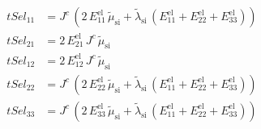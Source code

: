\begin{align}
tSel_{11} &= J^{c}\,\left(2\,E_{11}^{\mathrm{el}}\,\tilde{\mu }_{\mathrm{si}}+\tilde{\lambda }_{\mathrm{si}}\,\left(E_{11}^{\mathrm{el}}+E_{22}^{\mathrm{el}}+E_{33}^{\mathrm{el}}\right)\right) \\ 
tSel_{21} &= 2\,E_{21}^{\mathrm{el}}\,J^{c}\,\tilde{\mu }_{\mathrm{si}} \\ 
tSel_{12} &= 2\,E_{12}^{\mathrm{el}}\,J^{c}\,\tilde{\mu }_{\mathrm{si}} \\ 
tSel_{22} &= J^{c}\,\left(2\,E_{22}^{\mathrm{el}}\,\tilde{\mu }_{\mathrm{si}}+\tilde{\lambda }_{\mathrm{si}}\,\left(E_{11}^{\mathrm{el}}+E_{22}^{\mathrm{el}}+E_{33}^{\mathrm{el}}\right)\right) \\ 
tSel_{33} &= J^{c}\,\left(2\,E_{33}^{\mathrm{el}}\,\tilde{\mu }_{\mathrm{si}}+\tilde{\lambda }_{\mathrm{si}}\,\left(E_{11}^{\mathrm{el}}+E_{22}^{\mathrm{el}}+E_{33}^{\mathrm{el}}\right)\right) 
\end{align}
